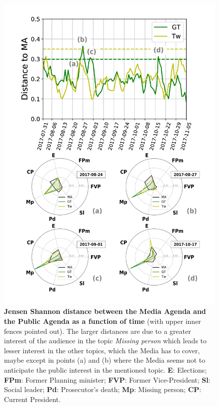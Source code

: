 \documentclass[a4paper, 12pt]{article}
\begin{document}
\begin{figure}[H]
\centering
\includegraphics[height = 0.75\textheight]{images/Fig4.pdf}
\caption{\textbf{Jensen Shannon distance between the Media Agenda and the Public Agenda as a function of time} (with upper inner fences pointed out). The larger distances are due to a greater interest of the audience in the topic \emph{Missing person} which leads to lesser interest in the other topics, which the Media has to cover, maybe except in points (a) and (b) where the Media seems not to anticipate the public interest in the mentioned topic. \textbf{E}: Elections; \textbf{FPm}: Former Planning minister; \textbf{FVP}: Former Vice-President; \textbf{Sl}: Social leader; \textbf{Pd}: Prosecutor's death; \textbf{Mp}: Missing person; \textbf{CP}: Current President.}
\label{fig:jensen_shannon_gt}
\end{figure}
\end{document}
